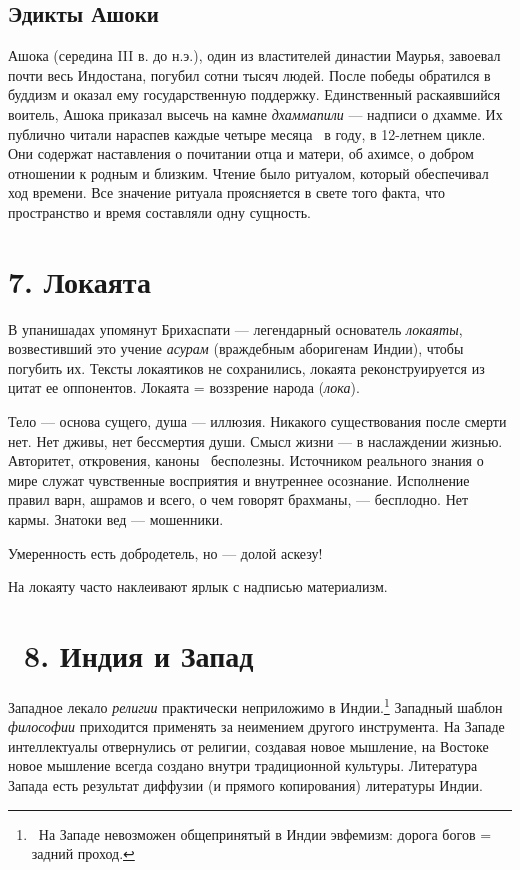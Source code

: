 \documentclass[a4paper]{article}
\begin{document}
\subsection[Эдикты Ашоки]{ Эдикты Ашоки}
{
Ашока (середина III в. до н.э.), один из властителей династии Маурья, завоевал почти весь Индостана, погубил сотни тысяч
людей. После победы обратился в буддизм и оказал ему государственную поддержку. Единственный раскаявшийся воитель,
Ашока приказал высечь на камне \textit{дхаммапили} — надписи о дхамме. Их публично читали нараспев каждые четыре месяца
\ в году, в 12-летнем цикле. Они содержат наставления о почитании отца и матери, об ахимсе, о добром отношении к родным
и близким. Чтение было ритуалом, который обеспечивал ход времени. Все значение ритуала проясняется в свете того факта,
что пространство и время составляли одну сущность.}

\section[7.
\textcyrillic{Л}\textcyrillic{о}\textcyrillic{к}\textcyrillic{а}\textcyrillic{я}\textcyrillic{т}\textcyrillic{а}
]{\foreignlanguage{russian}{7. Локаята }}
{
В упанишадах упомянут Брихаспати — легендарный основатель \textit{локаяты}, возвестивший это учение \textit{асурам}
(враждебным аборигенам Индии), чтобы погубить их. Тексты локаятиков не сохранились, локаята реконструируется из цитат
ее оппонентов. Локаята = воззрение народа (\textit{лока}). }

{
Тело — основа сущего, душа — иллюзия. Никакого существования после смерти нет. Нет дживы, нет бессмертия души. Смысл
жизни — в наслаждении жизнью. Авторитет, откровения, каноны \ бесполезны. Источником реального знания о мире служат
чувственные восприятия и внутреннее осознание. Исполнение правил варн, ашрамов и всего, о чем говорят брахманы, —
бесплодно. Нет кармы. Знатоки вед — мошенники. }

{
Умеренность есть добродетель, но — долой аскезу! }

{
На локаяту часто наклеивают ярлык с надписью {\textquotedbl}материализм{\textquotedbl}.}

\section[\ 8. \textcyrillic{И}\textcyrillic{н}\textcyrillic{д}\textcyrillic{и}\textcyrillic{я} \textcyrillic{и}
\textcyrillic{З}\textcyrillic{а}\textcyrillic{п}\textcyrillic{а}\textcyrillic{д} ]{\foreignlanguage{russian}{\ 8. Индия
и Запад }}
{
Западное лекало \textit{религии} практически неприложимо в Индии.\footnote{\foreignlanguage{russian}{\ На Западе
невозможен общепринятый в Индии эвфемизм: дорога богов = задний проход.}} Западный шаблон \textit{философии} приходится
применять за неимением другого инструмента. На Западе интеллектуалы отвернулись от религии, создавая новое мышление, на
Востоке новое мышление всегда создано внутри традиционной культуры. Литература Запада есть результат диффузии (и
прямого копирования) литературы Индии.}
\end{document}
